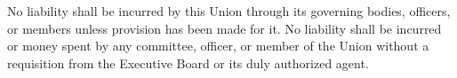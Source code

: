 
No liability shall be incurred by this Union through its governing bodies, officers, or members unless
provision has been made for it. No liability shall be incurred or money spent by any committee, officer,
or member of the Union without a requisition from the Executive Board or its duly authorized agent. 